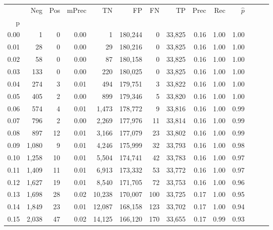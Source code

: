\begin{tabular}{rrrrrrrrrrrrrr}
\toprule
{} &    Neg &  Pos & mPrec &       TN &       FP &      FN &      TP &  Prec &   Rec & $\hat{p}$ \\
p    &        &      &       &          &          &         &         &       &       &           \\
\midrule
0.00 &      1 &    0 &  0.00 &        1 &  180,244 &       0 &  33,825 &  0.16 &  1.00 &      1.00 \\
0.01 &     28 &    0 &  0.00 &       29 &  180,216 &       0 &  33,825 &  0.16 &  1.00 &      1.00 \\
0.02 &     58 &    0 &  0.00 &       87 &  180,158 &       0 &  33,825 &  0.16 &  1.00 &      1.00 \\
0.03 &    133 &    0 &  0.00 &      220 &  180,025 &       0 &  33,825 &  0.16 &  1.00 &      1.00 \\
0.04 &    274 &    3 &  0.01 &      494 &  179,751 &       3 &  33,822 &  0.16 &  1.00 &      1.00 \\
0.05 &    405 &    2 &  0.00 &      899 &  179,346 &       5 &  33,820 &  0.16 &  1.00 &      1.00 \\
0.06 &    574 &    4 &  0.01 &    1,473 &  178,772 &       9 &  33,816 &  0.16 &  1.00 &      0.99 \\
0.07 &    796 &    2 &  0.00 &    2,269 &  177,976 &      11 &  33,814 &  0.16 &  1.00 &      0.99 \\
0.08 &    897 &   12 &  0.01 &    3,166 &  177,079 &      23 &  33,802 &  0.16 &  1.00 &      0.99 \\
0.09 &  1,080 &    9 &  0.01 &    4,246 &  175,999 &      32 &  33,793 &  0.16 &  1.00 &      0.98 \\
0.10 &  1,258 &   10 &  0.01 &    5,504 &  174,741 &      42 &  33,783 &  0.16 &  1.00 &      0.97 \\
0.11 &  1,409 &   11 &  0.01 &    6,913 &  173,332 &      53 &  33,772 &  0.16 &  1.00 &      0.97 \\
0.12 &  1,627 &   19 &  0.01 &    8,540 &  171,705 &      72 &  33,753 &  0.16 &  1.00 &      0.96 \\
0.13 &  1,698 &   28 &  0.02 &   10,238 &  170,007 &     100 &  33,725 &  0.17 &  1.00 &      0.95 \\
0.14 &  1,849 &   23 &  0.01 &   12,087 &  168,158 &     123 &  33,702 &  0.17 &  1.00 &      0.94 \\
0.15 &  2,038 &   47 &  0.02 &   14,125 &  166,120 &     170 &  33,655 &  0.17 &  0.99 &      0.93 \\

\end{tabular}
